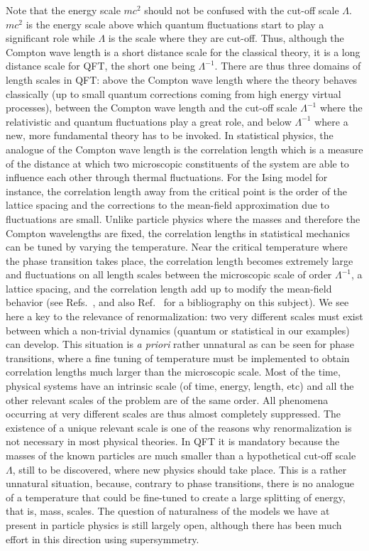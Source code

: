 \documentclass[floatfix,preprintnumbers,amsmath,amssymb,prb,12pt]{revtex4-1}
\begin{document}
{Note that the energy scale $m c^2$ should not be confused with
the cut-off scale
$\Lambda$. $m c^2$ is the energy scale above which quantum
fluctuations start to play a significant role while
$\Lambda$ is the scale where they are cut-off. Thus, although the
Compton wave length is a short distance scale for the classical
theory, it is a long distance scale for QFT, the short one being
$\Lambda^{-1}$. There are thus three domains of length scales in
QFT: above the Compton wave length where the theory behaves
classically (up to small quantum corrections coming from high
energy virtual processes), between the Compton wave length and
the cut-off scale $\Lambda^{-1}$ where the relativistic and
quantum fluctuations play a great role, and below $\Lambda^{-1}$
where a new, more fundamental theory has to be
invoked.\cite{lepage89} In statistical physics, the analogue of
the Compton wave length is the correlation length which is a
measure of the distance at which two microscopic constituents of
the system are able to
influence each other through thermal fluctuations.\cite{foot11}
 For the Ising model for instance, the
correlation length away from the critical point 
 is the order of the lattice spacing and the
corrections to the mean-field approximation due to fluctuations
are small. Unlike particle physics where the masses and therefore
the Compton wavelengths
are fixed, the correlation lengths in statistical mechanics can
be tuned by varying the temperature. Near the critical temperature
where the phase transition
takes place, the correlation length becomes extremely large 
and fluctuations on all length scales between the microscopic
scale of order
$\Lambda^{-1}$, a lattice spacing,
and the correlation length add up to modify the mean-field
behavior (see Refs.~,  
and also Ref.~ for a 
bibliography on this subject). We see here a key to the
relevance of renormalization: two very different scales must exist
between which a non-trivial dynamics (quantum or statistical in
our examples) can develop. This situation is {\em a priori} rather
unnatural as can be seen for phase transitions,
where a fine tuning of temperature must be implemented to obtain
correlation lengths much larger than the microscopic scale. Most
of the time, physical systems have an intrinsic scale (of time,
energy, length, etc) and all the other relevant scales of the
problem are of the same order. All phenomena occurring at very
different scales are thus almost completely suppressed. The existence
of a unique relevant scale is one of the reasons why renormalization is not
necessary in most physical theories. In QFT it is mandatory
because the masses of the known particles are much smaller
than a hypothetical cut-off scale $\Lambda$, still to be
discovered, where new physics should take place. This is a rather
unnatural situation, because, contrary to phase transitions, there
is no analogue of a temperature that could be fine-tuned to
create a large splitting of energy, that is, mass, scales. The
question of naturalness of the models we have at present in
particle physics is still largely open, although there has been
much effort in this direction using supersymmetry.

}
\end{document}
